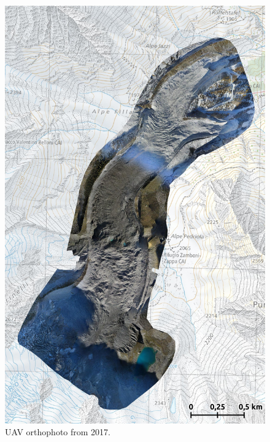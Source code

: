\begin{figure}[p]
    \centering
    \includegraphics[height=\textheight]{figures/appendix/orto_2017.jpg}
    \caption{UAV orthophoto from 2017.}
\end{figure}

